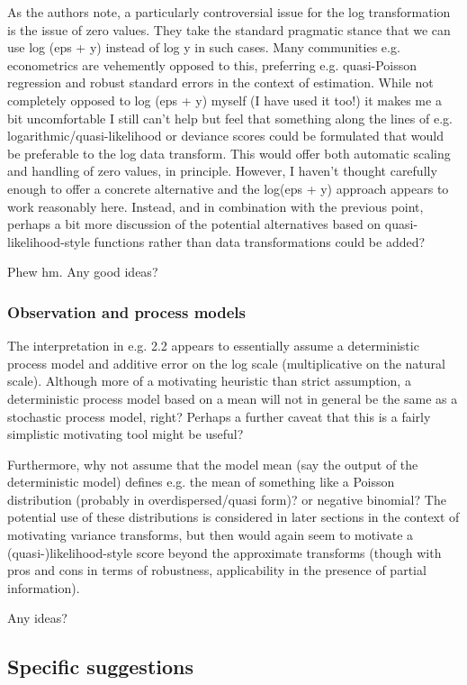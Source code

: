 \documentclass{article}
\newcommand{\red}{\color{red}}
\newcommand{\black}{\color{black}}
\newcommand{\blue}{\color{blue}}
\begin{document}
As the authors note, a particularly controversial issue for the log transformation is the issue of zero values. They take the standard pragmatic stance that we can use log (eps + y) instead of log y in such cases. Many communities e.g. econometrics are vehemently opposed to this, preferring e.g. quasi-Poisson regression and robust standard errors in the context of estimation. While not completely opposed to log (eps + y) myself (I have used it too!) it makes me a bit uncomfortable I still can’t help but feel that something along the lines of e.g. logarithmic/quasi-likelihood or deviance scores could be formulated that would be preferable to the log data transform. This would offer both automatic scaling and handling of zero values, in principle. However, I haven’t thought carefully enough to offer a concrete alternative and the log(eps + y) approach appears to work reasonably here. Instead, and in combination with the previous point, perhaps a bit more discussion of the potential alternatives based on quasi-likelihood-style functions rather than data transformations could be added?

\black
Phew hm. Any good ideas? 

\red
\subsubsection{Observation and process models}
The interpretation in e.g. 2.2 appears to essentially assume a deterministic process model and additive error on the log scale (multiplicative on the natural scale). Although more of a motivating heuristic than strict assumption, a deterministic process model based on a mean will not in general be the same as a stochastic process model, right? Perhaps a further caveat that this is a fairly simplistic motivating tool might be useful?

Furthermore, why not assume that the model mean (say the output of the deterministic model) defines e.g. the mean of something like a Poisson distribution (probably in overdispersed/quasi form)? or negative binomial? The potential use of these distributions is considered in later sections in the context of motivating variance transforms, but then would again seem to motivate a (quasi-)likelihood-style score beyond the approximate transforms (though with pros and cons in terms of robustness, applicability in the presence of partial information).

\black
Any ideas?

\blue
\subsection{Specific suggestions}
\end{document}
